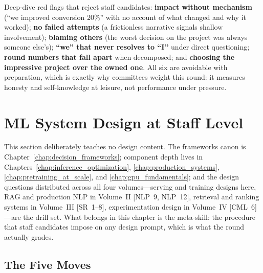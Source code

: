 \begin{warningbox}
Deep-dive red flags that reject staff candidates: \textbf{impact without mechanism} (``we improved conversion 20\%'' with no account of what changed and why it worked); \textbf{no failed attempts} (a frictionless narrative signals shallow involvement); \textbf{blaming others} (the worst decision on the project was always someone else's); \textbf{``we'' that never resolves to ``I''} under direct questioning; \textbf{round numbers that fall apart} when decomposed; and \textbf{choosing the impressive project over the owned one}. All six are avoidable with preparation, which is exactly why committees weight this round: it measures honesty and self-knowledge at leisure, not performance under pressure.
\end{warningbox}

\section{ML System Design at Staff Level}
\label{sec:staff_system_design}

This section deliberately teaches no design content. The frameworks canon is Chapter~\ref{chap:decision_frameworks}; component depth lives in Chapters~\ref{chap:inference_optimization}, \ref{chap:production_systems}, \ref{chap:pretraining_at_scale}, and \ref{chap:gpu_fundamentals}; and the design questions distributed across all four volumes---serving and training designs here, RAG and production NLP in Volume~II [NLP~9, NLP~12], retrieval and ranking systems in Volume~III [SR~1--8], experimentation design in Volume~IV [CML~6]---are the drill set. What belongs in this chapter is the meta-skill: the procedure that staff candidates impose on any design prompt, which is what the round actually grades.

\subsection{The Five Moves}

